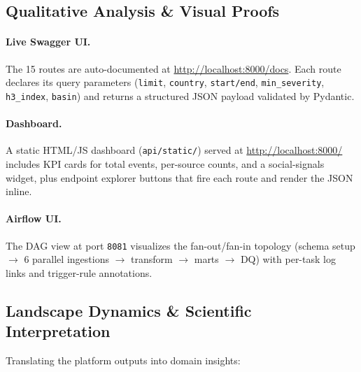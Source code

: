 \documentclass[11pt,a4paper]{article}
\begin{document}
\subsection{Qualitative Analysis \& Visual Proofs}

\paragraph{Live Swagger UI.} The 15 routes are auto-documented at
\url{http://localhost:8000/docs}. Each route declares its query
parameters (\texttt{limit}, \texttt{country}, \texttt{start/end},
\texttt{min\_severity}, \texttt{h3\_index}, \texttt{basin}) and returns
a structured JSON payload validated by Pydantic.

\paragraph{Dashboard.} A static HTML/JS dashboard (\texttt{api/static/})
served at \url{http://localhost:8000/} includes KPI cards for total
events, per-source counts, and a social-signals widget, plus endpoint
explorer buttons that fire each route and render the JSON inline.

\paragraph{Airflow UI.} The DAG view at port \texttt{8081} visualizes
the fan-out/fan-in topology (schema setup $\to$ 6 parallel ingestions
$\to$ transform $\to$ marts $\to$ DQ) with per-task log links and
trigger-rule annotations.

\subsection{Landscape Dynamics \& Scientific Interpretation}

Translating the platform outputs into domain insights:
\end{document}
